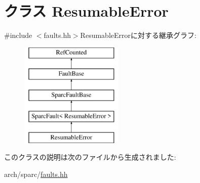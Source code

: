 \hypertarget{classSparcISA_1_1ResumableError}{
\section{クラス ResumableError}
\label{classSparcISA_1_1ResumableError}
}


{\ttfamily \#include $<$faults.hh$>$}ResumableErrorに対する継承グラフ:\begin{figure}[H]
\begin{center}
\leavevmode
\includegraphics[height=5cm]{classSparcISA_1_1ResumableError}
\end{center}
\end{figure}


このクラスの説明は次のファイルから生成されました:\begin{DoxyCompactItemize}
\item 
arch/sparc/\hyperlink{arch_2sparc_2faults_8hh}{faults.hh}\end{DoxyCompactItemize}
